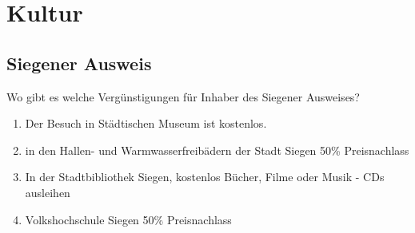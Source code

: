 \chapter{Kultur}

\section{Siegener Ausweis} 
Wo gibt es welche Vergünstigungen für Inhaber des Siegener Ausweises?
\begin{enumerate}
	\item Der Besuch in Städtischen Museum ist kostenlos.
	\item in den Hallen- und Warmwasserfreibädern der Stadt Siegen 50\%  Preisnachlass 
	\item In der Stadtbibliothek Siegen, kostenlos Bücher, Filme oder Musik - CDs ausleihen 
	\item Volkshochschule Siegen 50\% Preisnachlass  
\end{enumerate}

